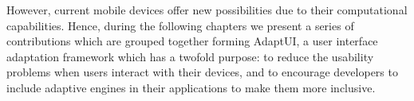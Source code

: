 However, current mobile devices offer new possibilities due to their 
computational capabilities. Hence, during the following chapters we present a
series of contributions which are grouped together forming AdaptUI, a user 
interface adaptation framework which has a twofold purpose: to reduce the 
usability problems when users interact with their devices, and to encourage 
developers to include adaptive engines in their applications to make them more 
inclusive.






